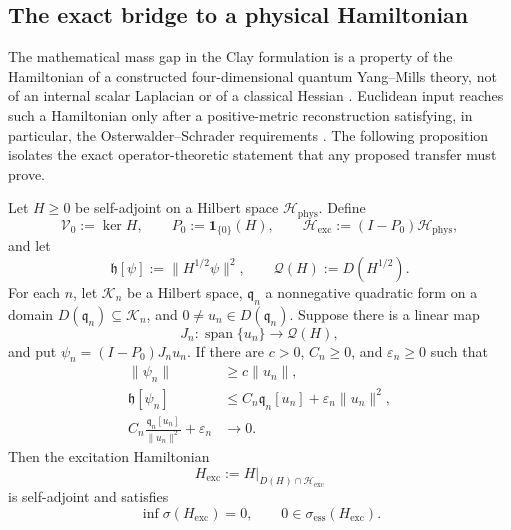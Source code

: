 \subsection{The exact bridge to a physical Hamiltonian}
\label{cusp-interpretation-physical-bridge-subsection}

The mathematical mass gap in the Clay formulation is a property of the
Hamiltonian of a constructed four-dimensional quantum Yang--Mills theory,
not of an internal scalar Laplacian or of a classical Hessian
\cite{JaffeWitten2000}.  Euclidean input reaches such a Hamiltonian only
after a positive-metric reconstruction satisfying, in particular, the
Osterwalder--Schrader requirements
\cite{OsterwalderSchrader1973,OsterwalderSchrader1975}.  The following
proposition isolates the exact operator-theoretic statement that any proposed
transfer must prove.

\begin{proposition}
\label{cusp-interpretation-typed-physical-transfer}
Let \(H\ge0\) be self-adjoint on a Hilbert space
\(\mathcal H_{\mathrm{phys}}\).  Define
\begin{equation}
 \mathcal V_0:=\ker H,
 \qquad P_0:=\mathbf1_{\{0\}}(H),
 \qquad
 \mathcal H_{\mathrm{exc}}:=(I-P_0)\mathcal H_{\mathrm{phys}},
 \label{cusp-interpretation-excitation-space}
\end{equation}
and let
\begin{equation}
 \mathfrak h[\psi]:=\lVert H^{1/2}\psi\rVert^2,
 \qquad
 \mathcal Q(H):=D(H^{1/2}).
 \label{cusp-interpretation-Hamiltonian-form}
\end{equation}
For each \(n\), let \(\mathcal K_n\) be a Hilbert space,
\(\mathfrak q_n\) a nonnegative quadratic form on a domain
\(D(\mathfrak q_n)\subseteq\mathcal K_n\), and
\(0\ne u_n\in D(\mathfrak q_n)\).  Suppose there is a linear map
\[
 J_n:\operatorname{span}\{u_n\}\longrightarrow\mathcal Q(H),
\]
and put
\(\psi_n=(I-P_0)J_nu_n\).  If there are \(c>0\), \(C_n\ge0\), and
\(\varepsilon_n\ge0\) such that
\begin{align}
 \lVert\psi_n\rVert
 &\ge c\lVert u_n\rVert,
 \label{cusp-interpretation-norm-noncollapse}\\
 \mathfrak h[\psi_n]
 &\le C_n\mathfrak q_n[u_n]
       +\varepsilon_n\lVert u_n\rVert^2,
 \label{cusp-interpretation-energy-transfer}\\
 C_n\frac{\mathfrak q_n[u_n]}{\lVert u_n\rVert^2}
   +\varepsilon_n&\longrightarrow0.
 \label{cusp-interpretation-physical-smallness}
\end{align}
Then the excitation Hamiltonian
\[
 H_{\mathrm{exc}}
 :=H\big|_{D(H)\cap\mathcal H_{\mathrm{exc}}}
\]
is self-adjoint and satisfies
\begin{equation}
 \inf\sigma(H_{\mathrm{exc}})=0,
 \qquad
 0\in\sigma_{\mathrm{ess}}(H_{\mathrm{exc}}).
 \label{cusp-interpretation-physical-gapless-conclusion}
\end{equation}
\end{proposition}

